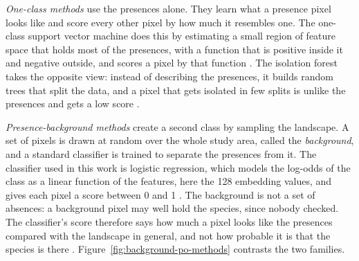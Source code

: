 \emph{One-class methods} use the presences alone. They learn what a
presence pixel looks like and score every other pixel by how much it
resembles one. The one-class support vector machine does this by
estimating a small region of feature space that holds most of the
presences, with a function that is positive inside it and negative
outside, and scores a pixel by that function
\cite{scholkopf2001}. The isolation forest takes the opposite view:
instead of describing the presences, it builds random trees that split
the data, and a pixel that gets isolated in few splits is unlike the
presences and gets a low score \cite{liu2008}.

\emph{Presence-background methods} create a second class by sampling
the landscape. A set of pixels is drawn at random over the whole study
area, called the \emph{background}, and a standard classifier is
trained to separate the presences from it. The classifier used in this
work is logistic regression, which models the log-odds of the class as
a linear function of the features, here the 128 embedding values, and
gives each pixel a score between 0 and 1 \cite{james2021}. The background is not a set
of absences: a background pixel may well hold the species, since
nobody checked. The classifier's score therefore says how much a pixel
looks like the presences compared with the landscape in general, and
not how probable it is that the species is there \cite{phillips2006}.
Figure~\ref{fig:background-po-methods} contrasts the two families.

